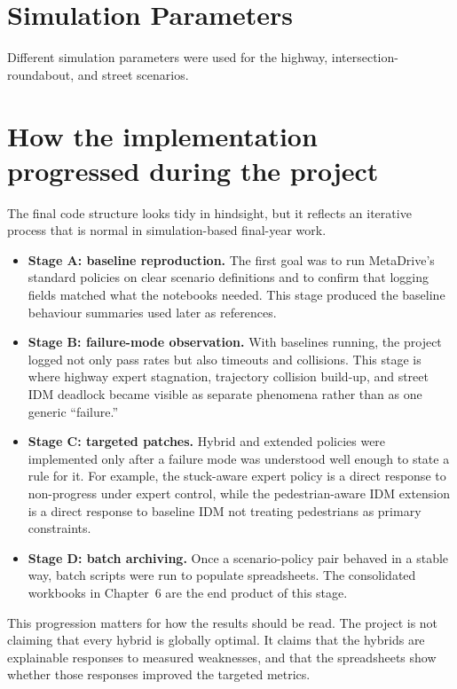 \documentclass[12pt,a4paper]{report}
\begin{document}
\section{Simulation Parameters}
Different simulation parameters were used for the highway, intersection-roundabout, and street scenarios.

\section{How the implementation progressed during the project}
The final code structure looks tidy in hindsight, but it reflects an iterative process that is normal in simulation-based final-year work.

\begin{itemize}
    \item \textbf{Stage A: baseline reproduction.} The first goal was to run MetaDrive's standard policies on clear scenario definitions and to confirm that logging fields matched what the notebooks needed. This stage produced the baseline behaviour summaries used later as references.
    \item \textbf{Stage B: failure-mode observation.} With baselines running, the project logged not only pass rates but also timeouts and collisions. This stage is where highway expert stagnation, trajectory collision build-up, and street IDM deadlock became visible as separate phenomena rather than as one generic ``failure.''
    \item \textbf{Stage C: targeted patches.} Hybrid and extended policies were implemented only after a failure mode was understood well enough to state a rule for it. For example, the stuck-aware expert policy is a direct response to non-progress under expert control, while the pedestrian-aware IDM extension is a direct response to baseline IDM not treating pedestrians as primary constraints.
    \item \textbf{Stage D: batch archiving.} Once a scenario-policy pair behaved in a stable way, batch scripts were run to populate spreadsheets. The consolidated workbooks in Chapter~6 are the end product of this stage.
\end{itemize}

This progression matters for how the results should be read. The project is not claiming that every hybrid is globally optimal. It claims that the hybrids are explainable responses to measured weaknesses, and that the spreadsheets show whether those responses improved the targeted metrics.
\end{document}
